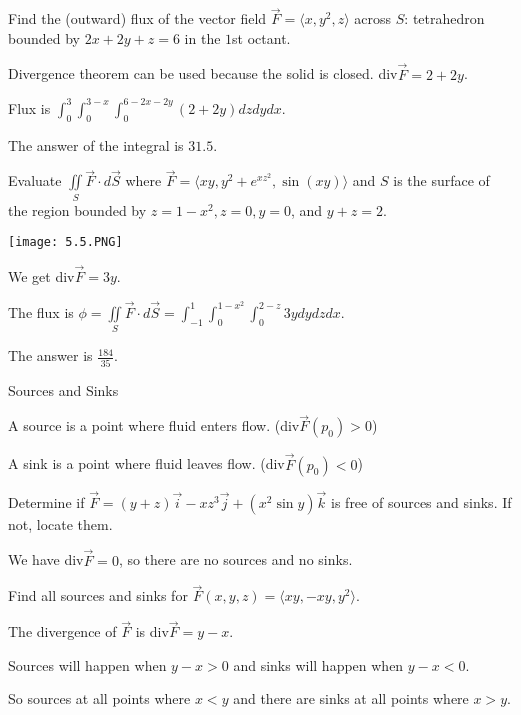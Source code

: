 \documentclass[../calc3.tex]{subfiles}
\begin{document}
\begin{example}
    Find the (outward) flux of the vector field $\vec{F}=\langle x,y^2,z\rangle$ across $S$: tetrahedron bounded by $2x+2y+z=6$ in the $1$st octant.

    Divergence theorem can be used because the solid is closed. div$\vec{F}=2+2y$.

    Flux is $\int_0^3 \int_0^{3-x} \int_0^{6-2x-2y} (2+2y)dz dy dx$.

    The answer of the integral is $31.5$.
\end{example}

\begin{example}
    Evaluate $\iint\limits_{S}\vec{F}\cdot d\vec{S}$ where $\vec{F}=\langle xy,y^2+e^{xz^2},\sin(xy)\rangle$ and $S$ is the surface of the region bounded by $z=1-x^2,z=0,y=0$, and $y+z=2$.
\begin{center}
        \texttt{[image: 5.5.PNG]}
    \end{center}

    We get div$\vec{F}=3y$.

    The flux is $\phi = \iint\limits_{S}\vec{F}\cdot d\vec{S}=\int_{-1}^1 \int_0^{1-x^2} \int_0^{2-z} 3y dy dz dx$.

    The answer is $\frac{184}{35}$.
\end{example}

Sources and Sinks

A source is a point where fluid enters flow. (div$\vec{F}(p_0)>0$)

A sink is a point where fluid leaves flow. (div$\vec{F}(p_0)<0$)

\begin{example}
    Determine if $\vec{F}=(y+z)\vec{i}-xz^3\vec{j}+(x^2\sin y)\vec{k}$ is free of sources and sinks. If not, locate them.

    We have div$\vec{F}=0$, so there are no sources and no sinks.
\end{example}

\begin{example}
    Find all sources and sinks for $\vec{F}(x,y,z)=\langle xy,-xy,y^2\rangle$.

    The divergence of $\vec{F}$ is div$\vec{F}=y-x$.

    Sources will happen when $y-x>0$ and sinks will happen when $y-x<0$.

    So sources at all points where $x<y$ and there are sinks at all points where $x>y$.
\end{example}
\end{document}
